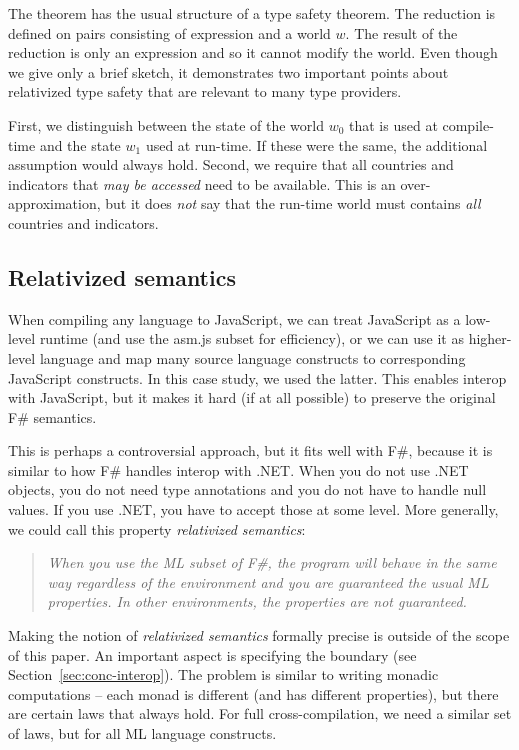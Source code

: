 \documentclass[submission,copyright,creativecommons]{eptcs}
\newcommand{\kvd}[1]{\textnormal{\textcolor{kvdclr}{\sffamily #1}}}
\begin{document}
\noindent
The theorem has the usual structure of a type safety theorem. The reduction is defined on pairs
consisting of expression and a world $w$. The result of the reduction is only an expression and
so it cannot modify the world. Even though we give only a brief sketch, it demonstrates two
important points about relativized type safety that are relevant to many type providers.

First, we distinguish between the state of the world $w_0$ that is used at compile-time and the
state $w_1$ used at run-time. If these were the same, the additional assumption would always hold.
Second, we require that all countries and indicators that \emph{may be accessed} need to be
available. This is an over-approximation, but it does \emph{not} say that
the run-time world must contains \emph{all} countries and indicators.

\subsection{Relativized semantics}
\label{sec:js-relative}

When compiling any language to JavaScript, we can treat JavaScript as a low-level runtime
(and use the asm.js \cite{asm-js} subset for efficiency), or we can use it as
higher-level language and map many source language constructs to corresponding JavaScript
constructs. In this case study, we used the latter. This enables interop with JavaScript, but
it makes it hard (if at all possible) to preserve the original F\# semantics.

This is perhaps a controversial approach, but it fits well with F\#, because it is similar to
how F\# handles interop with .NET. When you do not use .NET objects, you do not need type
annotations and you do not have to handle \kvd{null} values. If you use .NET, you have to
accept those at some level. More generally, we could call this property \emph{relativized
semantics}:

\begin{quotation}
\noindent
\emph{When you use the ML subset of F\#, the program will behave in the same way regardless
of the environment and you are guaranteed the usual ML properties. In other environments,
the properties are not guaranteed.}
\end{quotation}

\noindent
Making the notion of \emph{relativized semantics} formally precise is outside of the scope
of this paper. An important aspect is specifying the boundary (see Section~\ref{sec:conc-interop}).
The problem is similar to writing monadic computations -- each monad is different (and has
different properties), but there are certain laws that always hold. For full cross-compilation,
we need a similar set of laws, but for all ML language constructs.
\end{document}
